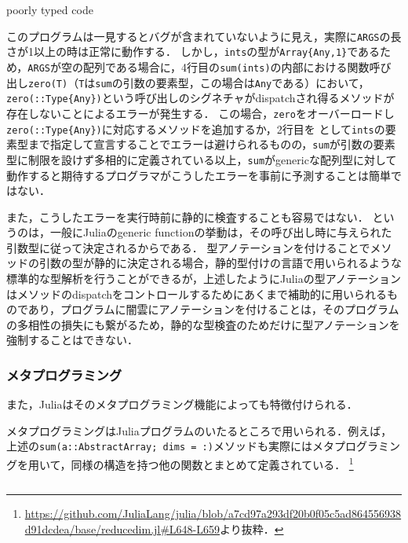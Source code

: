 \begin{listing}[ht]
  \inputminted[frame=lines]{julia}{src/parse_sum.jl}
  \caption{poorly typed code}
  \label{lst:target1}
\end{listing}

このプログラムは一見するとバグが含まれていないように見え，実際に\verb|ARGS|の長さが1以上の時は正常に動作する．
しかし，\verb|ints|の型が\verb|Array{Any,1}|であるため，\verb|ARGS|が空の配列である場合に，4行目の\verb|sum(ints)|の内部における関数呼び出し\verb|zero(T)|（\verb|T|は\verb|sum|の引数の要素型，この場合は\verb|Any|である）において， \verb|zero(::Type{Any})|という呼び出しのシグネチャがdispatchされ得るメソッドが存在しないことによるエラーが発生する．
この場合，\verb|zero|をオーバーロードし\verb|zero(::Type{Any})|に対応するメソッドを追加するか，2行目を  として\verb|ints|の要素型まで指定して宣言することでエラーは避けられるものの，\verb|sum|が引数の要素型に制限を設けず多相的に定義されている以上，\verb|sum|がgenericな配列型に対して動作すると期待するプログラマがこうしたエラーを事前に予測することは簡単ではない．

また，こうしたエラーを実行時前に静的に検査することも容易ではない．
というのは，一般にJuliaのgeneric functionの挙動は，その呼び出し時に与えられた引数型に従って決定されるからである．
型アノテーションを付けることでメソッドの引数の型が静的に決定される場合，静的型付けの言語で用いられるような標準的な型解析を行うことができるが，上述したようにJuliaの型アノテーションはメソッドのdispatchをコントロールするためにあくまで補助的に用いられるものであり，プログラムに闇雲にアノテーションを付けることは，そのプログラムの多相性の損失にも繋がるため，静的な型検査のためだけに型アノテーションを強制することはできない．

\subsubsection{メタプログラミング}

また，Juliaはそのメタプログラミング機能によっても特徴付けられる．

メタプログラミングはJuliaプログラムのいたるところで用いられる．例えば，上述の\verb|sum(a::AbstractArray; dims = :)|メソッドも実際にはメタプログラミングを用いて，同様の構造を持つ他の関数とまとめて定義されている．
\footnote{
  \url{https://github.com/JuliaLang/julia/blob/a7cd97a293df20b0f05c5ad864556938d91dcdea/base/reducedim.jl\#L648-L659}より抜粋．
}

\inputminted[frame=lines, firstline=3, lastline=12, breaklines]{julia}{src/sums_def.jl}

